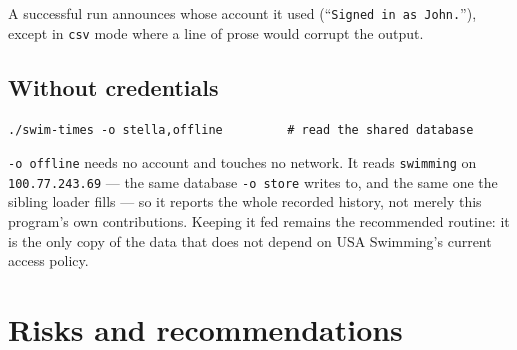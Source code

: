 \documentclass[11pt]{article}
\newcommand{\code}[1]{\texttt{#1}}
\begin{document}
\noindent A successful run announces whose account it used
(``\code{Signed in as John.}''), except in \code{csv} mode where a line
of prose would corrupt the output.

\subsection{Without credentials}

\begin{lstlisting}
./swim-times -o stella,offline         # read the shared database
\end{lstlisting}

\noindent \code{-o offline} needs no account and touches no network.  It
reads \code{swimming} on \code{100.77.243.69} --- the same database
\code{-o store} writes to, and the same one the sibling loader fills ---
so it reports the whole recorded history, not merely this program's own
contributions.  Keeping it fed remains the recommended routine: it is
the only copy of the data that does not depend on USA Swimming's
current access policy.

\section{Risks and recommendations}
\end{document}
